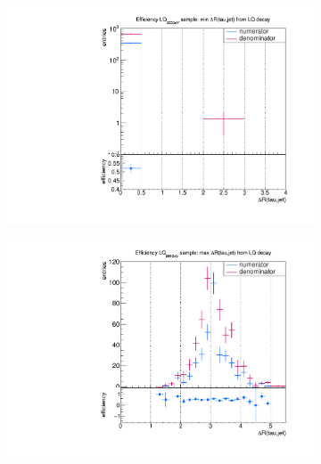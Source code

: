 \begin{figure}
  \centering
                \begin{subfigure}[t]{0.49\textwidth}
                \includegraphics[width=\textwidth]{figures/plots/LQ75/Divided_fromLQ_mindR_taujet.pdf}
                \label{dRFromLQ:signal:taujet:minLQ75}
                \end{subfigure}
                \begin{subfigure}[t]{0.49\textwidth}
                \includegraphics[width=\textwidth]{figures/plots/LQ75/Divided_maxdR_fromLQ_taujet.pdf}

\end{subfigure}
\end{figure}
